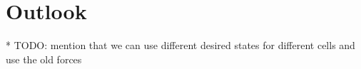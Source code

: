 \section{Outlook}

* TODO: mention that we can use different desired states for different cells and use the old forces 
